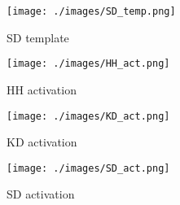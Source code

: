 \begin{figure}[h!]
  \texttt{[image: ./images/SD\_temp.png]}
  \caption{SD template}
  \label{}
\end{figure}




\begin{figure}[h!]
  \texttt{[image: ./images/HH\_act.png]}
  \caption{HH activation}
  \label{}
\end{figure}




\begin{figure}[h!]
  \texttt{[image: ./images/KD\_act.png]}
  \caption{KD activation}
  \label{}
\end{figure}




\begin{figure}[h!]
  \texttt{[image: ./images/SD\_act.png]}
  \caption{SD activation}
  \label{}
\end{figure}




